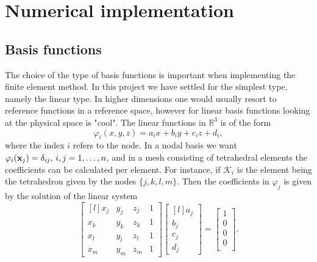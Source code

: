 \section{Numerical implementation}
\subsection{Basis functions}
The choice of the type of basis functions is important when implementing the finite element method. In this project we have settled for the simplest type, namely the linear type. In higher dimensions one would usually resort to reference functions in a reference space, however for linear basis functions looking at the physical space is "cool". The linear functions in $\mathbb{R}^3$ is of the form
\begin{equation}
	\varphi_i(x,y,z) = a_ix + b_iy + c_iz + d_i,
\end{equation}
where the index $i$ refers to the node. In a nodal basis we want $\varphi_i(\vb{x}_j) = \delta_{ij},\, i,j = 1,\dots,n$, and in a mesh consisting of tetrahedral elements the coefficients can be calculated per element. For instance, if $\mathcal{K}_i$ is the element being the tetrahedron given by the nodes $\{j,k,l,m\}$. Then the coefficients in $\varphi_j$ is given by the solution of the linear system
\begin{equation}
    \begin{bmatrix*}[l]
        x_j & y_j & z_j & 1 \\
        x_k & y_k & z_k & 1 \\
        x_l & y_l & z_l & 1 \\
        x_m & y_m & z_m & 1
     \end{bmatrix*}
     \begin{bmatrix*}[l]
        a_j \\
        b_j \\
        c_j \\
        d_j 
    \end{bmatrix*}
    =
    \begin{bmatrix}
        1 \\
        0 \\
        0 \\
        0 \\
    \end{bmatrix}.
    \label{eq:coeff_sys}
\end{equation}

